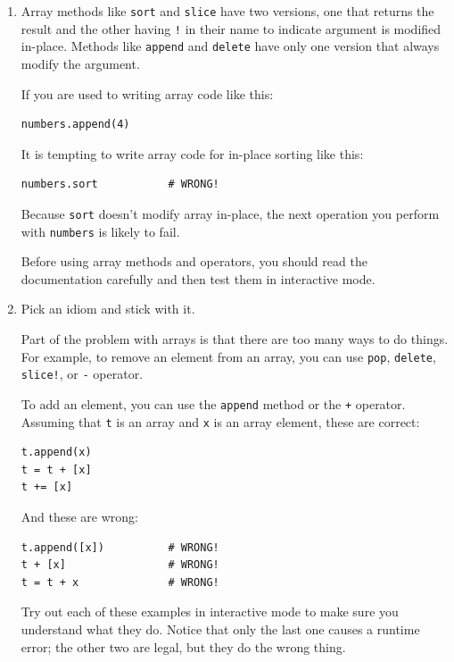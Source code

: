 \documentclass[10pt]{book}
\begin{document}
\begin{enumerate}

\item Array methods like {\tt sort} and {\tt slice} have two
    versions, one that returns the result and the other
    having {\tt !} in their name to indicate argument is modified in-place.
    Methods like {\tt append} and {\tt delete} have only one version
    that always modify the argument.

If you are used to writing array code like this:

\begin{verbatim}
numbers.append(4)
\end{verbatim}

It is tempting to write array code for in-place sorting like this:

\begin{verbatim}
numbers.sort           # WRONG!
\end{verbatim}

Because {\tt sort} doesn't modify array in-place, the
next operation you perform with {\tt numbers} is likely to fail.

Before using array methods and operators, you should read the
documentation carefully and then test them in interactive mode.

\item Pick an idiom and stick with it.

Part of the problem with arrays is that there are too many
ways to do things.  For example, to remove an element from
an array, you can use {\tt pop}, {\tt delete}, {\tt slice!},
or {\tt -} operator.

To add an element, you can use the {\tt append} method or
the {\tt +} operator.  Assuming that {\tt t} is an array and
{\tt x} is an array element, these are correct: 

\begin{verbatim}
t.append(x)
t = t + [x]
t += [x]
\end{verbatim}

And these are wrong:

\begin{verbatim}
t.append([x])          # WRONG!
t + [x]                # WRONG!
t = t + x              # WRONG!
\end{verbatim}

Try out each of these examples in interactive mode to make sure
you understand what they do.  Notice that only the last
one causes a runtime error; the other two are legal, but they
do the wrong thing.



\end{enumerate}
\end{document}
